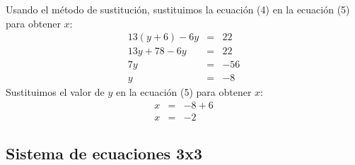 \documentclass[12pt,addpoints]{repaso}
\begin{document}
\begin{questions}
{\begin{multicols}{2}
\begin{parts}
                \setcounter{equation}{0}

                \begin{solutionbox}{7cm}
                    Usando el método de sustitución, sustituimos la ecuación (4) en la ecuación (5) para obtener $x$:
                    \begin{eqnarray}
                        13(y+6)-6y & = & 22 \nonumber\\
                        13y+78-6y & = & 22 \nonumber\\
                        7y & = & -56 \nonumber\\
                        y & = & -8 \nonumber
                    \end{eqnarray}
                    Sustituimos el valor de $y$ en la ecuación (5) para obtener $x$:
                    \begin{eqnarray}
                        x & = & -8+6 \nonumber\\
                        x & = & -2 \nonumber
                    \end{eqnarray}
                \end{solutionbox}
            \end{parts}
        \end{multicols}
    }
 
    \subsection{Sistema de ecuaciones 3x3}

\end{questions}
\end{document}
